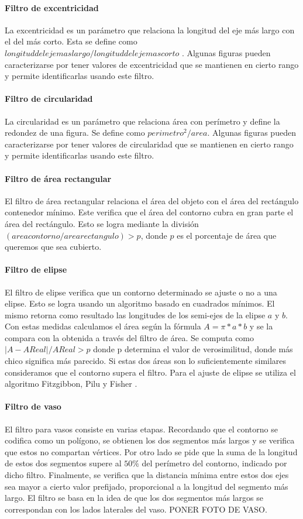	\paragraph{Filtro de excentricidad}
	La excentricidad es un parámetro que relaciona la longitud del eje más largo con el del más corto. Esta se define como 
	$longitud del eje mas largo/ longitud del eje mas corto$ . Algunas figuras pueden caracterizarse por tener valores de excentricidad
	que se mantienen en cierto rango y permite identificarlas usando este filtro.
	\paragraph{Filtro de circularidad}
	La circularidad es un parámetro que relaciona área con perímetro y define la redondez de una figura. Se define como $perimetro^2/area$. Algunas figuras pueden 
	caracterizarse por tener valores de circularidad que se mantienen en cierto rango y permite identificarlas usando este filtro.
	\paragraph{Filtro de área rectangular}
	El filtro de área rectangular relaciona el área del objeto con el área del rectángulo contenedor mínimo. Este verifica que el área
	del contorno cubra en gran parte el área del rectángulo. Esto se logra mediante la división $(area contorno / area rectangulo)> p$, donde 
	$p$ es el porcentaje de área que queremos que sea cubierto.
	\paragraph{Filtro de elipse}
	El filtro de elipse verifica que un contorno determinado se ajuste o no a una elipse. Esto se logra usando un algoritmo basado 
	en cuadrados mínimos. El mismo retorna como resultado las longitudes de los semi-ejes de la elipse $a$ y $b$. Con estas medidas calculamos
	el área según la fórmula $A=\pi*a*b$ y se la compara con la obtenida a través del filtro de área. Se computa como $|A-AReal|/ AReal > p$ donde p determina el
	valor de verosimilitud, donde más chico significa más parecido. Si estas dos áreas son lo suficientemente similares consideramos que el contorno supera el filtro. 
	Para el ajuste de elipse se utiliza el algoritmo Fitzgibbon, Pilu y Fisher \cite{Fitzgibbon99}.
	\paragraph{Filtro de vaso}
	El filtro para vasos consiste en varias etapas. Recordando que el contorno se codifica como un polígono, se obtienen los dos segmentos 
	más largos y se verifica que estos no compartan vértices. Por otro lado se pide que la suma de la longitud de estos dos segmentos supere al $50\%$ del 
	perímetro del contorno, indicado por dicho filtro. Finalmente, se verifica que la distancia mínima entre estos dos ejes sea mayor a cierto valor prefijado, proporcional a la
	longitud del segmento más largo. El filtro se basa en la idea de que los dos segmentos más largos se correspondan con los lados laterales del vaso. PONER FOTO
	DE VASO.
